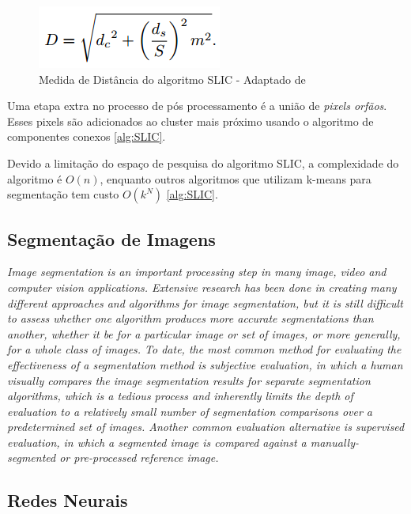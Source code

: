 \begin{document}
\begin{figure}[ht]
\centering
\includegraphics[width=.5\textwidth]{distance_slic.png}
\caption{Medida de Distância do algoritmo SLIC - Adaptado de \cite{SLIC}}
\label{fig:dist_slic}
\end{figure}

Uma etapa extra no processo de pós processamento é a união de \textit{pixels orfãos}. Esses pixels são adicionados ao cluster mais próximo usando o algoritmo de componentes conexos \ref{alg:SLIC}.

Devido a limitação do espaço de pesquisa do algoritmo SLIC, a complexidade do algoritmo é $O(n)$, enquanto outros algoritmos que utilizam k-means para segmentação tem custo $O(k^N)$ \ref{alg:SLIC}.

\subsection{Segmentação de Imagens} \label{ssec:segmentacao}

\textit{Image segmentation is an important processing step in many image, video and computer vision applications. Extensive research has been done in creating many different approaches and algorithms for image segmentation, but it is still difficult to assess whether one algorithm produces more accurate segmentations than another, whether it be for a particular image or set of images, or more generally, for a whole class of images. To date, the most common method for evaluating the effectiveness of a segmentation method is subjective evaluation, in which a human visually compares the image segmentation results for separate segmentation algorithms, which is a tedious process and inherently limits the depth of evaluation to a relatively small number of segmentation comparisons over a predetermined set of images. Another common evaluation alternative is supervised evaluation, in which a segmented image is compared against a manually-segmented or pre-processed reference image.}

\subsection{Redes Neurais} \label{ssec:redes_neurais}
\end{document}
